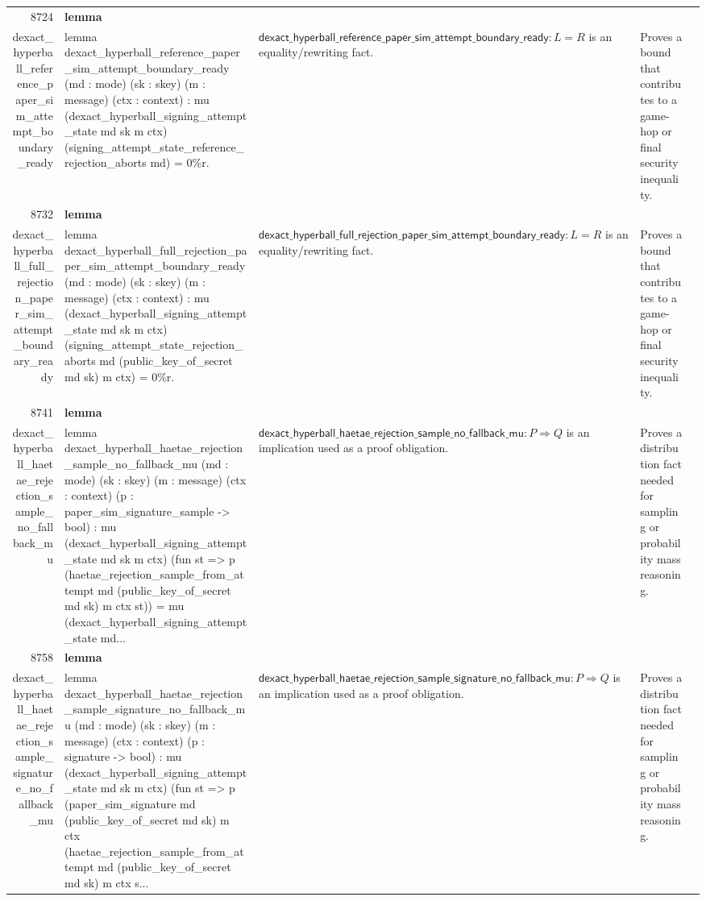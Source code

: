 \documentclass[10pt]{article}
\newcommand{\ec}[1]{\begingroup\ttfamily\scriptsize #1\endgroup}
\begin{document}
\begin{longtable}{r L{0.17\textwidth} L{0.26\textwidth} L{0.27\textwidth} L{0.20\textwidth}}
8724 & \textbf{lemma}\\\ec{dexact\_hyperball\_reference\_paper\_sim\_attempt\_boundary\_ready} & \ec{lemma dexact\_hyperball\_reference\_paper\_sim\_attempt\_boundary\_ready (md : mode) (sk : skey) (m : message) (ctx : context) : mu (dexact\_hyperball\_signing\_attempt\_state md sk m ctx) (signing\_attempt\_state\_reference\_rejection\_aborts md) = 0\%r.} & \(\mathsf{dexact\_hyperball\_reference\_paper\_sim\_attempt\_boundary\_ready} : L = R\) is an equality/rewriting fact. & Proves a bound that contributes to a game-hop or final security inequality. \\
8732 & \textbf{lemma}\\\ec{dexact\_hyperball\_full\_rejection\_paper\_sim\_attempt\_boundary\_ready} & \ec{lemma dexact\_hyperball\_full\_rejection\_paper\_sim\_attempt\_boundary\_ready (md : mode) (sk : skey) (m : message) (ctx : context) : mu (dexact\_hyperball\_signing\_attempt\_state md sk m ctx) (signing\_attempt\_state\_rejection\_aborts md (public\_key\_of\_secret md sk) m ctx) = 0\%r.} & \(\mathsf{dexact\_hyperball\_full\_rejection\_paper\_sim\_attempt\_boundary\_ready} : L = R\) is an equality/rewriting fact. & Proves a bound that contributes to a game-hop or final security inequality. \\
8741 & \textbf{lemma}\\\ec{dexact\_hyperball\_haetae\_rejection\_sample\_no\_fallback\_mu} & \ec{lemma dexact\_hyperball\_haetae\_rejection\_sample\_no\_fallback\_mu (md : mode) (sk : skey) (m : message) (ctx : context) (p : paper\_sim\_signature\_sample -> bool) : mu (dexact\_hyperball\_signing\_attempt\_state md sk m ctx) (fun st => p (haetae\_rejection\_sample\_from\_attempt md (public\_key\_of\_secret md sk) m ctx st)) = mu (dexact\_hyperball\_signing\_attempt\_state md...} & \(\mathsf{dexact\_hyperball\_haetae\_rejection\_sample\_no\_fallback\_mu} : P \Rightarrow Q\) is an implication used as a proof obligation. & Proves a distribution fact needed for sampling or probability mass reasoning. \\
8758 & \textbf{lemma}\\\ec{dexact\_hyperball\_haetae\_rejection\_sample\_signature\_no\_fallback\_mu} & \ec{lemma dexact\_hyperball\_haetae\_rejection\_sample\_signature\_no\_fallback\_mu (md : mode) (sk : skey) (m : message) (ctx : context) (p : signature -> bool) : mu (dexact\_hyperball\_signing\_attempt\_state md sk m ctx) (fun st => p (paper\_sim\_signature md (public\_key\_of\_secret md sk) m ctx (haetae\_rejection\_sample\_from\_attempt md (public\_key\_of\_secret md sk) m ctx s...} & \(\mathsf{dexact\_hyperball\_haetae\_rejection\_sample\_signature\_no\_fallback\_mu} : P \Rightarrow Q\) is an implication used as a proof obligation. & Proves a distribution fact needed for sampling or probability mass reasoning. \\

\end{longtable}
\end{document}
